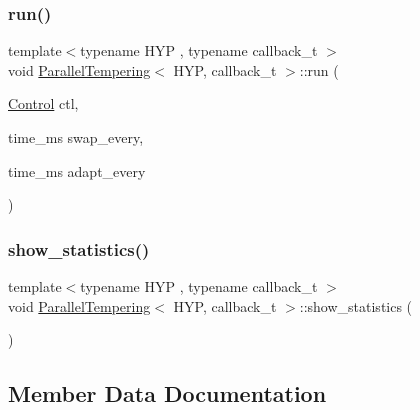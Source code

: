 \mbox{\label{class_parallel_tempering_ac8f4d01107b5f6a429179a1ad5d22896}} 
\subsubsection{\texorpdfstring{run()}{run()}\hspace{0.1cm}{\footnotesize\ttfamily [2/2]}}
{\footnotesize\ttfamily template$<$typename H\+YP , typename callback\+\_\+t $>$ \\
void \hyperlink{class_parallel_tempering}{Parallel\+Tempering}$<$ H\+YP, callback\+\_\+t $>$\+::run (\begin{DoxyParamCaption}\item[{\hyperlink{struct_control}{Control}}]{ctl,  }\item[{time\+\_\+ms}]{swap\+\_\+every,  }\item[{time\+\_\+ms}]{adapt\+\_\+every }\end{DoxyParamCaption})\hspace{0.3cm}{\ttfamily [inline]}}

\mbox{\label{class_parallel_tempering_a9e1960158b12a4dadfab54eb4fb895d3}} 
\subsubsection{\texorpdfstring{show\+\_\+statistics()}{show\_statistics()}}
{\footnotesize\ttfamily template$<$typename H\+YP , typename callback\+\_\+t $>$ \\
void \hyperlink{class_parallel_tempering}{Parallel\+Tempering}$<$ H\+YP, callback\+\_\+t $>$\+::show\+\_\+statistics (\begin{DoxyParamCaption}{ }\end{DoxyParamCaption})\hspace{0.3cm}{\ttfamily [inline]}}



\subsection{Member Data Documentation}
\mbox{\label{class_parallel_tempering_ae9f0a2af938df838cc4010983860394e}} 
